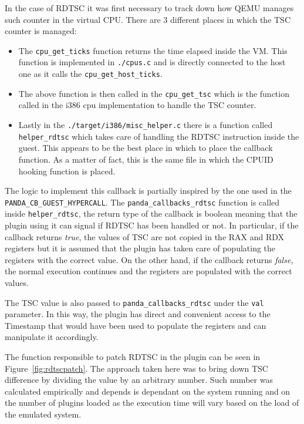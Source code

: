 In the case of RDTSC it was first necessary to track down how QEMU manages such counter in the virtual CPU. There are 3 different places in which the TSC counter is managed:

\begin{itemize}
    \item The \lstinline{cpu_get_ticks} function returns the time elapsed inside the VM. This function is implemented in \lstinline{./cpus.c} and is directly connected to the host one as it calls the \lstinline{cpu_get_host_ticks}.
    \item The above function is then called in the \lstinline{cpu_get_tsc} which is the function called in the i386 cpu implementation to handle the TSC counter. 
    \item Lastly in the \lstinline{./target/i386/misc_helper.c} there is a function called \lstinline{helper_rdtsc} which takes care of handling the RDTSC instruction inside the guest. This appears to be the best place in which to place the callback function. As a matter of fact, this is the same file in which the CPUID hooking function is placed. 
\end{itemize}

The logic to implement this callback is partially inspired by the one used in the \lstinline{PANDA_CB_GUEST_HYPERCALL}. The \lstinline{panda_callbacks_rdtsc} function is called inside \lstinline{helper_rdtsc}, the return type of the callback is boolean meaning that the plugin using it can signal if RDTSC has been handled or not. In particular, if the callback returns \textit{true}, the values of TSC are not copied in the RAX and RDX registers but it is assumed that the plugin has taken care of populating the registers with the correct value. On the other hand, if the callback returns \textit{false}, the normal execution continues and the registers are populated with the correct values. 

The TSC value is also passed to \lstinline{panda_callbacks_rdtsc} under the \lstinline{val} parameter. In this way, the plugin has direct and convenient access to the Timestamp that would have been used to populate the registers and can manipulate it accordingly.

The function responsible to patch RDTSC in the plugin can be seen in Figure~\ref{fig:rdtscpatch}. The approach taken here was to bring down TSC difference by dividing the value by an arbitrary number. Such number was calculated empirically and depends is dependant on the system running and on the number of plugins loaded as the execution time will vary based on the load of the emulated system.

